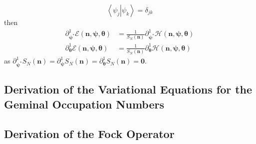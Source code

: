 \documentclass[aps,preprint]{revtex4}%
\begin{document}
\begin{equation}
\left\langle \left.  \psi_{j}\right\vert \psi_{k}\right\rangle =\delta_{jk}%
\end{equation}
then
\begin{align}
\partial_{\mathbf{\psi}^{\ast}}^{1}\mathcal{E}\left(  \mathbf{n},\mathbf{\psi
},\mathbf{\theta}\right)   &  =\frac{1}{S_{N}\left(  \mathbf{n}\right)
}\partial_{\mathbf{\psi}^{\ast}}^{1}\mathcal{H}\left(  \mathbf{n}%
,\mathbf{\psi},\mathbf{\theta}\right) \\
\partial_{\mathbf{\theta}}^{1}\mathcal{E}\left(  \mathbf{n},\mathbf{\psi
},\mathbf{\theta}\right)   &  =\frac{1}{S_{N}\left(  \mathbf{n}\right)
}\partial_{\mathbf{\theta}}^{1}\mathcal{H}\left(  \mathbf{n},\mathbf{\psi
},\mathbf{\theta}\right)
\end{align}
as $\partial_{\mathbf{\psi}^{\ast}}^{1}S_{N}\left(  \mathbf{n}\right)
=\partial_{\mathbf{\psi}}^{1}S_{N}\left(  \mathbf{n}\right)  =\partial
_{\mathbf{\theta}}^{1}S_{N}\left(  \mathbf{n}\right)  =\mathbf{0}$.

\subsection{Derivation of the Variational Equations for the Geminal Occupation
Numbers}

\subsection{Derivation of the Fock Operator}
\end{document}
